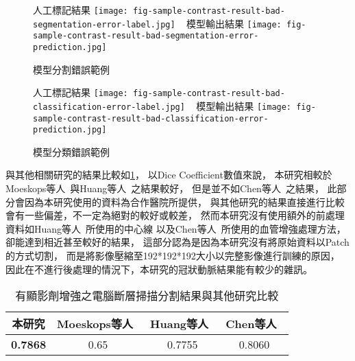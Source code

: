 \documentclass[class=NCU_thesis, crop=false]{standalone}
\begin{document}
\begin{figure}[!hbt]
    \centering
    \subcaptionbox
        {人工標記結果
        \label{fig:fig-sample-contrast-result-bad-segmentation-error-label}}
        {\texttt{[image: fig-sample-contrast-result-bad-segmentation-error-label.jpg]}}
    ~
    \subcaptionbox
        {模型輸出結果
        \label{fig:fig-sample-contrast-result-bad-segmentation-error-prediction}}
        {\texttt{[image: fig-sample-contrast-result-bad-segmentation-error-prediction.jpg]}}
    \caption{模型分割錯誤範例}
    \label{fig:fig-sample-contrast-result-bad-segmentation-error}
\end{figure}

\begin{figure}[!hbt]
    \centering
    \subcaptionbox
        {人工標記結果
        \label{fig:fig-sample-contrast-result-bad-classification-error-label}}
        {\texttt{[image: fig-sample-contrast-result-bad-classification-error-label.jpg]}}
    ~
    \subcaptionbox
        {模型輸出結果
        \label{fig:fig-sample-contrast-result-bad-classification-error-prediction}}
        {\texttt{[image: fig-sample-contrast-result-bad-classification-error-prediction.jpg]}}
    \caption{模型分類錯誤範例}
    \label{fig:fig-sample-contrast-result-bad-classification-error}
\end{figure}

與其他相關研究的結果比較如\cref{table:table-contrast-result-compare-others}，
以Dice Coefficient數值來說，
本研究相較於Moeskops等人~\cite{moeskopsDeepLearningMultitask2016}與Huang等人~\cite{huangCoronaryArterySegmentation2018}之結果較好，
但是並不如Chen等人~\cite{chenCoronaryArterySegmentation2019}之結果，
此部分會因為本研究使用的資料為合作醫院所提供，
與其他研究的結果直接進行比較會有一些偏差，不一定為絕對的較好或較差，
然而本研究沒有使用額外的前處理資料如Huang等人~\cite{huangCoronaryArterySegmentation2018}所使用的中心線
以及Chen等人~\cite{chenCoronaryArterySegmentation2019}所使用的血管增強處理方法，
卻能達到相近甚至較好的結果，
這部分認為是因為本研究沒有將原始資料以Patch的方式切割，
而是將影像壓縮至192*192*192大小以完整影像進行訓練的原因，
因此在不進行後處理的情況下，本研究的冠狀動脈結果能有較少的雜訊。

\begin{table}[h]
    \centering
    \caption{有顯影劑增強之電腦斷層掃描分割結果與其他研究比較}
    \label{table:table-contrast-result-compare-others}
    \begin{tabular}{cccc}
    \hline
    本研究 & Moeskops等人~\cite{moeskopsDeepLearningMultitask2016} & Huang等人~\cite{huangCoronaryArterySegmentation2018} & Chen等人~\cite{chenCoronaryArterySegmentation2019} \\
    \hline
    \textbf{0.7868} & 0.65 & 0.7755 & 0.8060 \\
    \hline
    \end{tabular}
\end{table}
\end{document}
